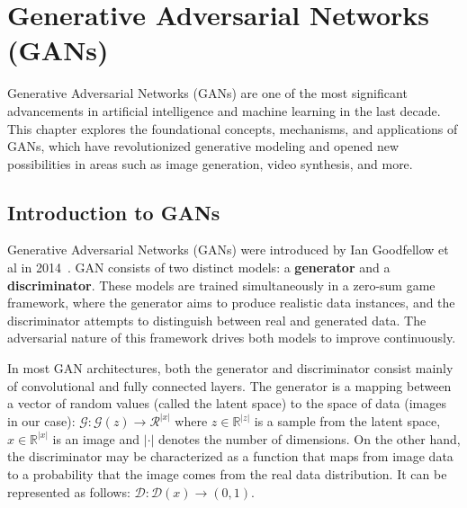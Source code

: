 
\section{Generative Adversarial Networks (GANs)}
\label{sec:GANs}

Generative Adversarial Networks (GANs) are one of the most significant advancements in artificial intelligence and machine learning in the last decade. This chapter explores the foundational concepts, mechanisms, and applications of GANs, which have revolutionized generative modeling and opened new possibilities in areas such as image generation, video synthesis, and more.

\subsection{Introduction to GANs}

Generative Adversarial Networks (GANs) were introduced by Ian Goodfellow et al in 2014~\cite{GANsOriginalPaper}. GAN consists of two distinct models: a \textbf{generator} and a \textbf{discriminator}. These models are trained simultaneously in a zero-sum game framework, where the generator aims to produce realistic data instances, and the discriminator attempts to distinguish between real and generated data. The adversarial nature of this framework drives both models to improve continuously.

In most GAN architectures, both the generator and discriminator consist mainly of convolutional and fully connected layers. The generator is a mapping between a vector of random values (called the latent space) to the space of data (images in our case): $\mathcal{G}: \mathcal{G}(z) \rightarrow \mathcal{R}^{|x|}$ where $z \in \mathbb{R}^{|z|}$ is a sample from the latent space, $x \in \mathbb{R}^{|x|}$ is an image and $| \cdot |$ denotes the number of dimensions. On the other hand, the discriminator may be characterized as a function that maps from image data to a probability that the image comes from the real data distribution. It can be represented as follows: $\mathcal{D}: \mathcal{D}(x) \rightarrow (0, 1)$.

